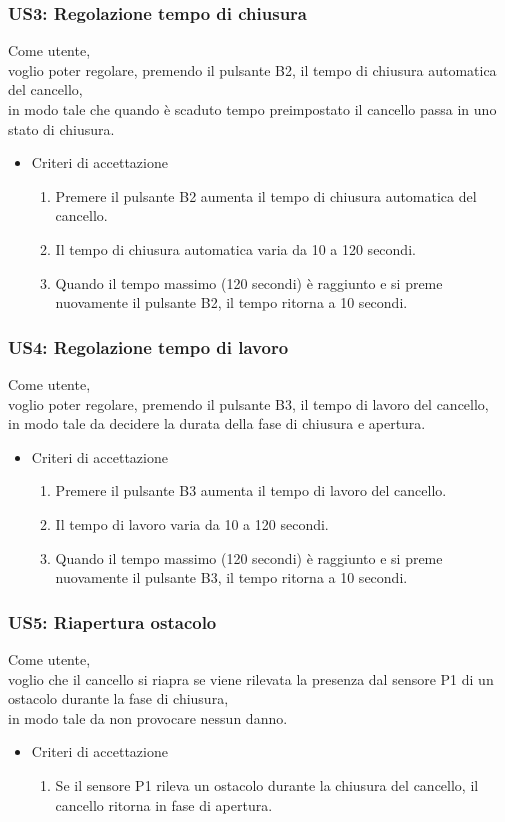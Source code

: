 \documentclass[12pt]{article}
\begin{document}
\subsubsection{US3: Regolazione tempo di chiusura}
Come utente, \\
voglio poter regolare, premendo il pulsante B2, il tempo di chiusura automatica del cancello,\\
in modo tale che quando è scaduto tempo preimpostato il cancello passa in uno stato di chiusura.
\begin{itemize}
    \item Criteri di accettazione
    \begin{enumerate}
        \item Premere il pulsante B2 aumenta il tempo di chiusura automatica del cancello.
        \item Il tempo di chiusura automatica varia da 10 a 120 secondi.
        \item Quando il tempo massimo (120 secondi) è raggiunto e si preme nuovamente il pulsante B2, il tempo ritorna a 10 secondi.
    \end{enumerate}
\end{itemize}
\subsubsection{US4: Regolazione tempo di lavoro}
Come utente, \\
voglio poter regolare, premendo il pulsante B3, il tempo di lavoro del cancello,\\
in modo tale da decidere la durata della fase di chiusura e apertura.
\begin{itemize}
    \item Criteri di accettazione
    \begin{enumerate}
        \item Premere il pulsante B3 aumenta il tempo di lavoro del cancello.
        \item Il tempo di lavoro varia da 10 a 120 secondi.
        \item Quando il tempo massimo (120 secondi) è raggiunto e si preme nuovamente il pulsante B3, il tempo ritorna a 10 secondi.
    \end{enumerate}
\end{itemize}
\subsubsection{US5: Riapertura ostacolo}
Come utente, \\
voglio che il cancello si riapra se viene rilevata la presenza dal sensore P1 di un ostacolo durante la fase di chiusura,\\
in modo tale da non provocare nessun danno.
\begin{itemize}
    \item Criteri di accettazione
    \begin{enumerate}
        \item Se il sensore P1 rileva un ostacolo durante la chiusura del cancello, il cancello ritorna in fase di apertura.
    \end{enumerate}
\end{itemize}
\end{document}

